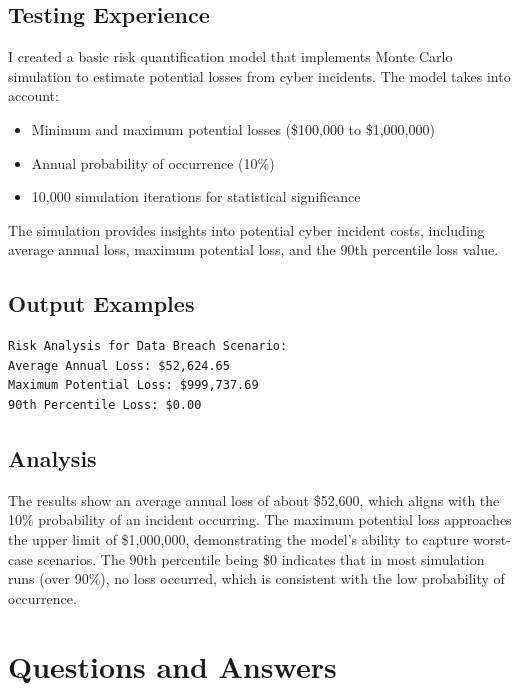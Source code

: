 \documentclass{article}
\begin{document}
\subsection{Testing Experience}
I created a basic risk quantification model that implements Monte Carlo simulation 
to estimate potential losses from cyber incidents. The model takes into account:
\begin{itemize}
    \item Minimum and maximum potential losses (\$100,000 to \$1,000,000)
    \item Annual probability of occurrence (10\%)
    \item 10,000 simulation iterations for statistical significance
\end{itemize}

The simulation provides insights into potential cyber incident costs, including average 
annual loss, maximum potential loss, and the 90th percentile loss value.

\subsection{Output Examples}
\begin{verbatim}
Risk Analysis for Data Breach Scenario:
Average Annual Loss: $52,624.65
Maximum Potential Loss: $999,737.69
90th Percentile Loss: $0.00
\end{verbatim}

\subsection{Analysis}
The results show an average annual loss of about \$52,600, which aligns with the 
10\% probability of an incident occurring. The maximum potential loss approaches 
the upper limit of \$1,000,000, demonstrating the model's ability to capture 
worst-case scenarios. The 90th percentile being \$0 indicates that in most 
simulation runs (over 90\%), no loss occurred, which is consistent with the 
low probability of occurrence.
\section{Questions and Answers}
\end{document}
